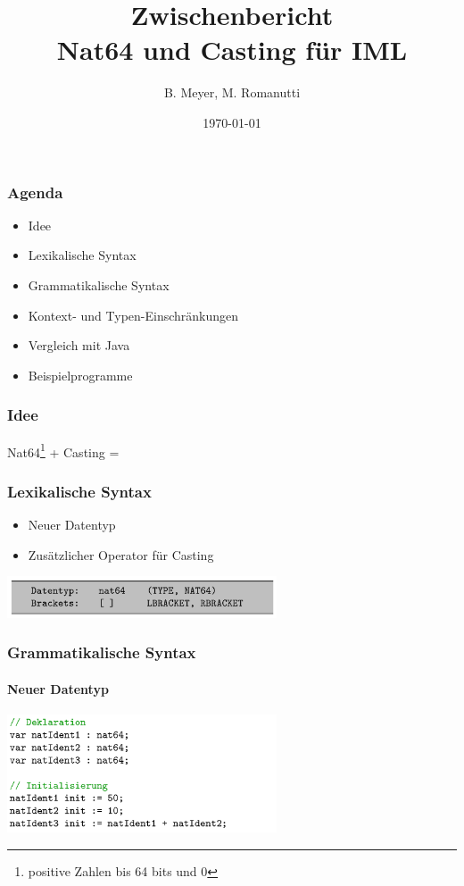\documentclass{beamer}
\title[Nat64 und Casting für IML]{Zwischenbericht \protect\\ Nat64 und Casting für IML}
\author{B. Meyer, M. Romanutti}
\date{\today}
\institute{FHNW}
\begin{document}
    \begin{frame}[plain]
        \maketitle
    \end{frame}

    \begin{frame}
        \frametitle{Agenda}
        \begin{itemize}
            \item Idee
            \item Lexikalische Syntax
            \item Grammatikalische Syntax
            \item Kontext- und Typen-Einschränkungen
            \item Vergleich mit Java
            \item Beispielprogramme
        \end{itemize}

    \end{frame}

    \begin{frame}
        \frametitle{Idee}
        \centering
        Nat64\footnote{positive Zahlen bis 64 bits und 0} + Casting = \faRocket
    \end{frame}

    \begin{frame}
        \frametitle{Lexikalische Syntax}
        \begin{itemize}
            \item Neuer Datentyp
            \item Zusätzlicher Operator für Casting
        \end{itemize}
        \vspace{30}
        {\hspace{15}\includegraphics[width=8cm]{listing_1.png}}

    \end{frame}

    \begin{frame}
        \frametitle{Grammatikalische Syntax}
        \framesubtitle{Neuer Datentyp}
        {\includegraphics[width=8cm]{listing_2.png}}
    \end{frame}
\end{document}

